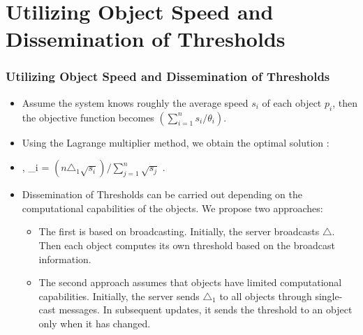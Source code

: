 \documentclass{beamer}
\begin{document}
\section{Utilizing Object Speed and Dissemination of Thresholds}
\begin{frame}
  \frametitle{Utilizing Object Speed and Dissemination of Thresholds}
  \begin{itemize}
    \item Assume the system knows roughly the average speed $s_{i}$ of each object $p_{i}$, then the objective function becomes   $(\sum\limits_{i=1}^n s_i/\theta_i) $.
    \item Using the Lagrange multiplier method, we obtain the optimal solution :
    \item {}, \theta_i = $({n}\triangle_{1} \sqrt{s_{i}})/\sum\limits_{j=1}^n \sqrt{s_{j}}$ .
    \item  Dissemination of Thresholds can be carried out depending on the computational capabilities of the objects. We propose two approaches:
          \begin{itemize}
            \item The first is
                  based on broadcasting. Initially, the
                  server broadcasts $\triangle$. Then each object
                  computes its own threshold based on the broadcast
                  information.
            \item The second approach assumes that objects have limited
                  computational capabilities. Initially, the server sends $\triangle_{1}$ to
                  all objects through single-cast messages. In subsequent
                  updates, it sends the threshold to an object only when it has
                  changed.
          \end{itemize}
  \end{itemize}
\end{frame}


\end{document}
